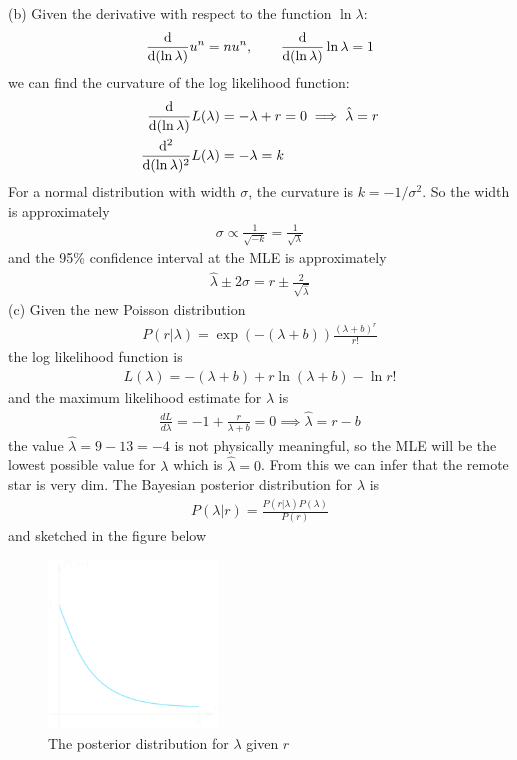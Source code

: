 \documentclass[../main.tex]{subfiles}
\begin{document}
(b) Given the derivative with respect to the function $\ln \lambda$:
\begin{align*}
    \dv{(\ln{\lambda})} u^n = nu^n, \qquad \dv{(\ln{\lambda})} \ln \lambda = 1
\end{align*}
we can find the curvature of the log likelihood function:
\begin{align*}
    \dv{(\ln \lambda)} L(\lambda) &= -\lambda + r = 0 \implies \hat \lambda = r \\
    \dv[2]{(\ln \lambda)} L(\lambda) &= -\lambda = k
\end{align*}
For a normal distribution with width $\sigma$, the curvature is $k = -1/\sigma^2$. So the width is
approximately
\begin{align*}
    \sigma \propto \frac{1}{\sqrt{-k}} = \frac{1}{\sqrt{\lambda}}
\end{align*}
and the 95\% confidence interval at the MLE is approximately
\begin{align*}
    \hat \lambda \pm 2\sigma = r \pm \frac{2}{\sqrt{\hat \lambda}}
\end{align*}
(c) Given the new Poisson distribution
\begin{align*}
    P(r | \lambda) = \exp(-(\lambda + b)) \frac{(\lambda + b)^r}{r!}
\end{align*}
the log likelihood function is
\begin{align*}
    L(\lambda) = -(\lambda + b) + r \ln(\lambda + b) - \ln r!
\end{align*}
and the maximum likelihood estimate for $\lambda$ is
\begin{align*}
    \frac{dL}{d\lambda} = -1 + \frac{r}{\lambda + b} = 0 \implies \hat \lambda = r - b
\end{align*}
the value $\hat \lambda = 9 - 13 = -4$ is not physically meaningful, so the MLE will be the lowest
possible value for $\lambda$ which is $\hat \lambda = 0$. From this we can infer that the remote 
star is very dim. The Bayesian posterior distribution for $\lambda$ is
\begin{align*}
    P(\lambda | r) = \frac{P(r | \lambda)P(\lambda)}{P(r)}
\end{align*}
and sketched in the figure below
\begin{figure}[ht]
    \centering
    \includegraphics[width=0.4\textwidth]{hw2_1.png}
    \caption{The posterior distribution for $\lambda$ given $r$}
\end{figure}
\end{document}
